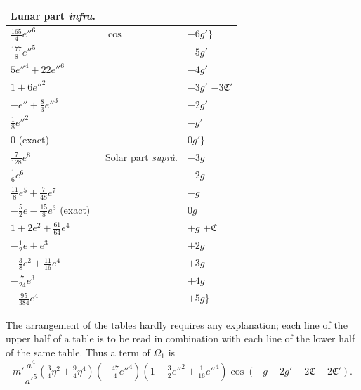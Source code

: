 \documentclass[12pt,a4paper]{article}
\theoremstyle{plain}
\begin{document}
\begin{center}
\begin{tabular}{|l|l|l|}
\hline
\multicolumn{1}{|c|}{Lunar part \textit{infra}.} & & \\
\hline
$\tfrac{165}{4}e''^{6}$              & $\cos$ & $-6g'\bigr\}$ \\
$\tfrac{177}{8}e''^{5}$              &        & $-5g'$ \\
$5e''^{4}+22e''^{6}$                 &        & $-4g'$ \\
$1+6e''^{2}$                         &        & $-3g'$ \quad $-3\mathfrak{C}'$ \\
$-e''+\tfrac{8}{3}e''^{3}$           &        & $-2g'$ \\
$\tfrac{1}{8}e''^{2}$                &        & $-g'$ \\
$0$ (exact)                          &        & $0g'\bigr\}$ \\
\hline
$\tfrac{7}{128}e^{8}$                                & Solar part \textit{supr\`a}. & $-3g$ \\
$\tfrac{1}{6}e^{6}$                                  &                              & $-2g$ \\
$\tfrac{11}{8}e^{5}+\tfrac{7}{48}e^{7}$              &                              & $-g$ \\
$-\tfrac{5}{2}e-\tfrac{15}{8}e^{3}$ (exact)          &                              & $0g$ \\
$1+2e^{2}+\tfrac{61}{64}e^{4}$                       &                              & $+g$ \quad $+\mathfrak{C}$ \\
$-\tfrac{1}{2}e+e^{3}$                               &                              & $+2g$ \\
$-\tfrac{3}{8}e^{2}+\tfrac{11}{16}e^{4}$             &                              & $+3g$ \\
$-\tfrac{7}{24}e^{3}$                                &                              & $+4g$ \\
$-\tfrac{95}{384}e^{4}$                              &                              & $+5g\bigr\}$ \\
\hline
\end{tabular}
\end{center}

\newpage
{} The arrangement of the tables hardly requires any explanation; each line of the upper half of a table is to be read in combination with each line of the lower half of the same table. Thus a term of $\Omega_{1}$ is
\[
m'\frac{a^{4}}{a'^{5}}(\tfrac{3}{4}\eta^{2}+\tfrac{9}{4}\eta^{4})(-\tfrac{47}{4}e''^{4})(1-\tfrac{3}{2}e''^{2}+\tfrac{1}{16}e''^{4})\cos(-g-2g'+2\mathfrak{C}-2\mathfrak{C}').
\]
\end{document}
